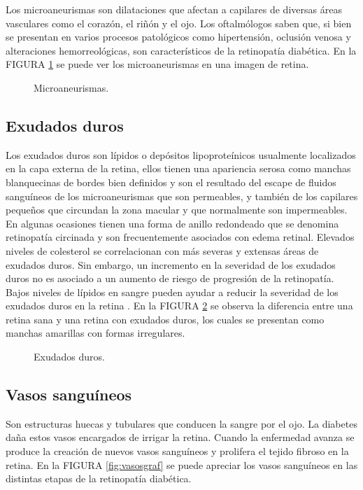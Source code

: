 Los microaneurismas son dilataciones que afectan a capilares de diversas áreas vasculares como el corazón, el riñón y el ojo. Los oftalmólogos saben que, si bien se presentan en varios procesos patológicos como hipertensión, oclusión venosa y alteraciones hemorreológicas, son característicos de la retinopatía diabética. En la FIGURA \ref{fig:sinvscon} se puede ver los microaneurismas en una imagen de retina.

\begin{figure}[H]
\centering
{}
\caption{Microaneurismas.} \label{fig:sinvscon}
\end{figure}
\subsection{Exudados duros}
Los exudados duros son lípidos o depósitos lipoproteínicos usualmente localizados en la capa externa de la retina, ellos tienen una apariencia serosa como manchas blanquecinas de bordes bien definidos y son el resultado del escape de fluidos sanguíneos de los microaneurismas que son permeables, y también de los capilares pequeños que circundan la zona macular y que normalmente son impermeables. En algunas ocasiones tienen una forma de anillo redondeado que se denomina retinopatía circinada y son frecuentemente asociados con edema retinal. Elevados niveles de colesterol se correlacionan con más severas y extensas áreas de exudados duros. Sin embargo, un incremento en la severidad de los exudados duros no es asociado a un aumento de riesgo de progresión de la retinopatía. Bajos niveles de lípidos en sangre pueden ayudar a reducir la severidad de los exudados duros en la retina \cite{PedroSaenzRetinopatiaDiabetica}. En la FIGURA \ref{fig:sanosvsexu} se observa la diferencia entre una retina sana y una retina con exudados duros, los cuales se presentan como manchas amarillas con formas irregulares.

\begin{figure}[H]
\centering
{}
\caption{Exudados duros.} \label{fig:sanosvsexu}
\end{figure}

\subsection{Vasos sanguíneos}
Son estructuras huecas y tubulares que conducen la sangre por el ojo. La diabetes daña estos vasos encargados de irrigar la retina. 
Cuando la enfermedad avanza se produce la creación de nuevos vasos sanguíneos  y prolifera el tejido fibroso en la retina. En la FIGURA \ref{fig:vasosgraf} se puede apreciar los vasos sanguíneos en las distintas etapas de la retinopatía diabética.

